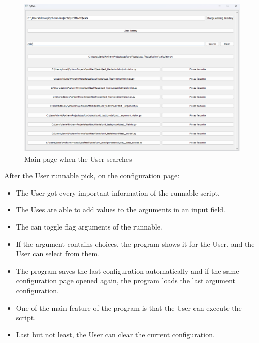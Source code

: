 \documentclass{article}
\begin{document}
\begin{figure}[h]
    \centering
    \includegraphics[width=1\linewidth]{img/search.png}
    \caption{Main page when the User searches}
    \label{fig:enter-label}
\end{figure}

\clearpage

After the User runnable pick, on the configuration page:
\begin{itemize}
    \item The User got every important information of the runnable script.
    \item The Uses are able to add values to the arguments in an input field. 
    \item The can toggle flag arguments of the runnable.
    \item If the argument contains choices, the program shows it for the User, and the User can select from them.
    \item The program saves the last configuration automatically and if the same configuration page opened again, the program loads the last argument configuration.
    \item One of the main feature of the program is that the User can execute the script.
    \item Last but not least, the User can clear the current configuration.
\end{itemize}
\end{document}
